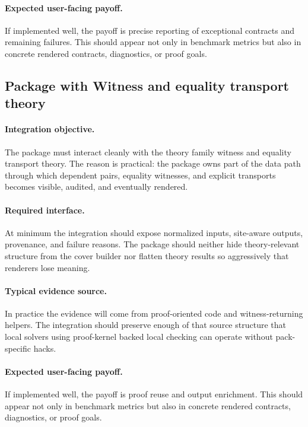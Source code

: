 \documentclass[11pt]{report}
\DeclareRobustCommand{\py}[1]{\texttt{\detokenize{#1}}}
\theoremstyle{definition}
\theoremstyle{plain}
\begin{document}
\paragraph{Expected user-facing payoff.}
If implemented well, the payoff is precise reporting of exceptional contracts and remaining failures. This should appear not only
in benchmark metrics but also in concrete rendered contracts,
diagnostics, or proof goals.


\subsection{Package \py{src/deppy/core} with Witness and equality transport theory}

\paragraph{Integration objective.}
The package \py{src/deppy/core} must interact cleanly with the
theory family witness and equality transport theory. The reason is practical: the
package owns part of the data path through which dependent pairs, equality witnesses, and explicit transports becomes
visible, audited, and eventually rendered.

\paragraph{Required interface.}
At minimum the integration should expose normalized inputs, site-aware
outputs, provenance, and failure reasons. The package should neither hide
theory-relevant structure from the cover builder nor flatten theory
results so aggressively that renderers lose meaning.

\paragraph{Typical evidence source.}
In practice the evidence will come from proof-oriented code and witness-returning helpers. The integration should
preserve enough of that source structure that local solvers using proof-kernel backed local checking
can operate without pack-specific hacks.

\paragraph{Expected user-facing payoff.}
If implemented well, the payoff is proof reuse and output enrichment. This should appear not only
in benchmark metrics but also in concrete rendered contracts,
diagnostics, or proof goals.
\end{document}
